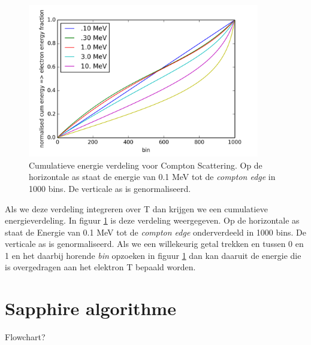 \documentclass[a4paper,11pt]{article}
\begin{document}
\begin{figure}[t]
  \begin{center}
    \includegraphics[width=0.9\textwidth]{cum-energy.png}
    \caption{\label{fig:cum-energy} Cumulatieve energie verdeling voor Compton Scattering. Op de horizontale as staat de energie van 0.1 MeV tot de \textit{compton edge} in 1000 bins. De verticale as is genormaliseerd.}
  \end{center}
\end{figure}

Als we deze verdeling integreren over T dan krijgen we een cumulatieve energieverdeling. In figuur \ref{fig:cum-energy} is deze verdeling weergegeven. Op de horizontale as staat de Energie van 0.1 MeV tot de \textit{compton edge} onderverdeeld in 1000 bins. De verticale as is genormaliseerd. Als we een willekeurig getal trekken en tussen 0 en 1 en het daarbij horende \textit{bin} opzoeken in figuur \ref{fig:cum-energy} dan kan daaruit de energie die is overgedragen aan het elektron T bepaald worden.


\section{Sapphire algorithme}
Flowchart?


{}

\end{document}
